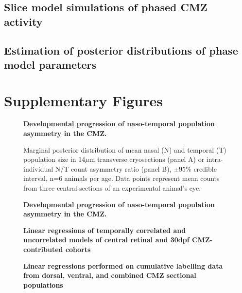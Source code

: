 \subsection{Slice model simulations of phased CMZ activity}

\subsection{Estimation of posterior distributions of phase model parameters}

\section{Supplementary Figures}

\begin{figure}[!h]
    \caption{{\bf Developmental progression of naso-temporal population asymmetry in the CMZ.}}
    \label{morphology}
\end{figure}

\begin{figure}[!h]
    \caption{{\bf Developmental progression of naso-temporal population asymmetry in the CMZ.}}
    Marginal posterior distribution of mean nasal (N) and temporal (T) population size in 14$\mu$m transverse cryosections (panel A) or intra-individual N/T count asymmetry ratio (panel B), $\pm 95\%$ credible interval, n=6 animals per age. Data points represent mean counts from three central sections of an experimental animal's eye. 
    \label{NTontology}
\end{figure}


\begin{figure}[!h]
    \caption{{\bf Linear regressions of temporally correlated and uncorrelated models of central retinal and 30dpf CMZ-contributed cohorts}}
    \label{a27linreg}
\end{figure}


\begin{figure}[!h]
    \caption{{\bf Linear regressions performed on cumulative labelling data from dorsal, ventral, and combined CMZ sectional populations}}
    \label{cumEdUlinreg}
\end{figure}


